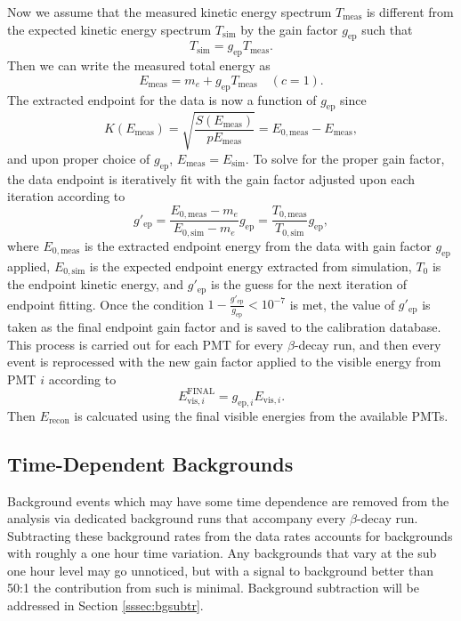 Now we assume that the measured kinetic energy spectrum $T_{\mathrm{meas}}$ is different from the expected
kinetic energy spectrum $T_{\mathrm{sim}}$ by the gain factor $g_{\mathrm{ep}}$ such that
%
\begin{equation}
  T_{\mathrm{sim}} = g_{\mathrm{ep}} T_{\mathrm{meas}}.
\end{equation}
Then we can write the
measured total energy as
\begin{equation}
  E_{\mathrm{meas}} = m_e + g_{\mathrm{ep}}T_{\mathrm{meas}} \quad (c=1).
\end{equation}
The extracted endpoint for the data is now a function of $g_{\mathrm{ep}}$
since
\begin{equation}
  K(E_{\mathrm{meas}}) = \sqrt{\frac{S(E_{\mathrm{meas}})}{pE_{\mathrm{meas}}}} = E_{0,\mathrm{meas}}-E_{\mathrm{meas}},
\end{equation}
and upon proper choice of $g_{\mathrm{ep}}$, $E_{\mathrm{meas}}=E_{\mathrm{sim}}$. To solve for
the proper gain factor, the data endpoint is iteratively fit with the gain factor adjusted upon each iteration
according to
%
\begin{equation}
  g'_{\mathrm{ep}} = \frac{ E_{0,\mathrm{meas}}- m_e}{ E_{0,\mathrm{sim}}- m_e}g_{\mathrm{ep}} =  \frac{ T_{0,\mathrm{meas}}}{ T_{0,\mathrm{sim}}}g_{\mathrm{ep}}, 
\end{equation}
%
where $E_{0,\mathrm{meas}}$ is the extracted endpoint energy from the data with gain factor $g_{\mathrm{ep}}$ applied,
$E_{0,\mathrm{sim}}$ is the expected endpoint energy extracted from simulation, $T_0$ is the endpoint kinetic energy,
and $g'_{\mathrm{ep}}$ is the guess for the next iteration of endpoint fitting.
Once the condition $1-\frac{g'_{\mathrm{ep}}}{g_{\mathrm{ep}}}<10^{-7}$ is met, the value of $g'_{\mathrm{ep}}$ is taken as the final
endpoint gain factor and is saved to the calibration database. This process is carried out for each PMT for every
$\beta$-decay run, and then every event is reprocessed with the new gain factor applied to the visible energy from PMT
$i$ according to
%
\begin{equation}
  E_{\mathrm{vis},i}^{\mathrm{FINAL}} = g_{\mathrm{ep},i} E_{\mathrm{vis},i}.
\end{equation}
Then $E_{\mathrm{recon}}$ is calcuated using the final visible energies from the available PMTs.



\subsection{Time-Dependent Backgrounds}
Background events which may have some time dependence are removed from the analysis
via dedicated background runs that accompany every $\beta$-decay run.
Subtracting these background rates from the data rates accounts for backgrounds
with roughly a one hour time variation.
Any backgrounds that vary at the sub one hour level may go unnoticed, but
with a signal to background better than 50:1 the contribution from such is minimal.
Background subtraction will be addressed in Section \ref{sssec:bgsubtr}. 

